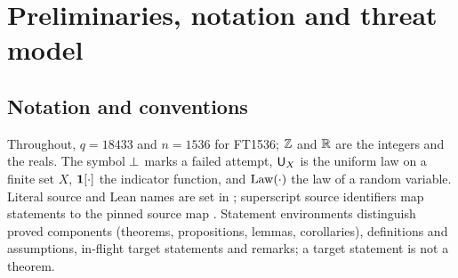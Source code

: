 \section{Preliminaries, notation and threat model}\label{sec:model}
\subsection{Notation and conventions}\label{sec:notation}
Throughout, $q=18433$ and $n=1536$ for FT1536; $\mathbb{Z}$ and $\mathbb{R}$ are the
integers and the reals. The symbol $\bot$ marks a failed attempt,
$\mathsf{U}_X$ is the uniform law on a finite set $X$, $\mathbf{1}[\cdot]$ the
indicator function, and $\operatorname{Law}(\cdot)$ the law of a random variable.
Literal source and Lean names are set in ; superscript
source identifiers map statements to the pinned source map
. Statement environments distinguish proved components
(theorems, propositions, lemmas, corollaries), definitions and
assumptions, in-flight target statements and remarks; a target
statement is not a theorem.

